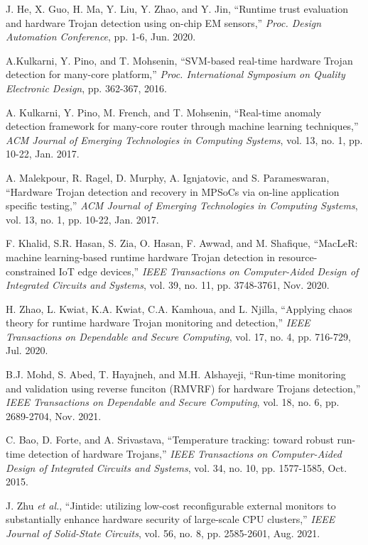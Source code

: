 \documentclass[10pt,journal]{IEEEtran}
\begin{document}
\begin{thebibliography}{99}
J. He, X. Guo, H. Ma, Y. Liu, Y. Zhao, and Y. Jin, ``Runtime trust evaluation and hardware Trojan detection using on-chip EM sensors,'' \textit{Proc. Design Automation Conference}, pp. 1-6, Jun. 2020.

A.Kulkarni, Y. Pino, and T. Mohsenin, ``SVM-based real-time hardware Trojan detection for many-core platform,'' \textit{Proc. International Symposium on Quality Electronic Design}, pp. 362-367, 2016.

A. Kulkarni, Y. Pino, M. French, and T. Mohsenin, ``Real-time anomaly detection framework for many-core router through machine learning techniques,'' \textit{ACM Journal of Emerging Technologies in Computing Systems}, vol. 13, no. 1, pp. 10-22, Jan. 2017.

A. Malekpour, R. Ragel, D. Murphy, A. Ignjatovic, and S. Parameswaran, ``Hardware Trojan detection and recovery in MPSoCs via on-line application specific testing,'' \textit{ACM Journal of Emerging Technologies in Computing Systems}, vol. 13, no. 1, pp. 10-22, Jan. 2017.

F. Khalid, S.R. Hasan, S. Zia, O. Hasan, F. Awwad, and M. Shafique, ``MacLeR: machine learning-based runtime hardware Trojan detection in resource-constrained IoT edge devices,'' \textit{IEEE Transactions on Computer-Aided Design of Integrated Circuits and Systems}, vol. 39, no. 11, pp. 3748-3761, Nov. 2020.

H. Zhao, L. Kwiat, K.A. Kwiat, C.A. Kamhoua, and L. Njilla, ``Applying chaos theory for runtime hardware Trojan monitoring and detection,'' \textit{IEEE Transactions on Dependable and Secure Computing}, vol. 17, no. 4, pp. 716-729, Jul. 2020.

B.J. Mohd, S. Abed, T. Hayajneh, and M.H. Alshayeji, ``Run-time monitoring and validation using reverse funciton (RMVRF) for hardware Trojans detection,'' \textit{IEEE Transactions on Dependable and Secure Computing}, vol. 18, no. 6, pp. 2689-2704, Nov. 2021.

C. Bao, D. Forte, and A. Srivastava, ``Temperature tracking: toward robust run-time detection of hardware Trojans,'' \textit{IEEE Transactions on Computer-Aided Design of Integrated Circuits and Systems}, vol. 34, no. 10, pp. 1577-1585, Oct. 2015.

J. Zhu \textit{et al.}, ``Jintide: utilizing low-cost reconfigurable external monitors to substantially enhance hardware security of large-scale CPU clusters,'' \textit{IEEE Journal of Solid-State Circuits}, vol. 56, no. 8, pp. 2585-2601, Aug. 2021.


\end{thebibliography}
\end{document}
